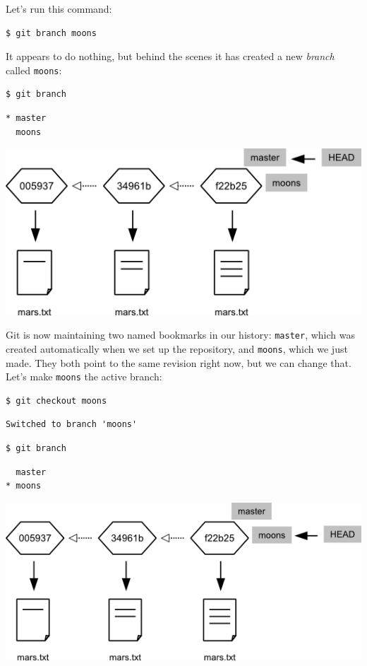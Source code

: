 \documentclass[]{book}
\newcommand{\gdef}[2]{\emph{#2}}
\begin{document}
Let's run this command:

\begin{verbatim}
$ git branch moons
\end{verbatim}

It appears to do nothing, but behind the scenes it has created a new
\gdef{g:branch}{branch} called \texttt{moons}:

\begin{verbatim}
$ git branch
\end{verbatim}

\begin{verbatim}
* master
  moons
\end{verbatim}

\includegraphics{novice/extras/img/git-branching-02.png}

Git is now maintaining two named bookmarks in our history:
\texttt{master}, which was created automatically when we set up the
repository, and \texttt{moons}, which we just made. They both point to
the same revision right now, but we can change that. Let's make
\texttt{moons} the active branch:

\begin{verbatim}
$ git checkout moons
\end{verbatim}

\begin{verbatim}
Switched to branch 'moons'
\end{verbatim}

\begin{verbatim}
$ git branch
\end{verbatim}

\begin{verbatim}
  master
* moons
\end{verbatim}

\includegraphics{novice/extras/img/git-branching-03.png}
\end{document}
